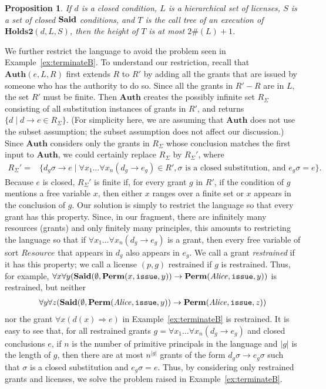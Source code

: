 \documentclass{acmtrans2m}
\newtheorem{proposition}[theorem]{Proposition}
\newcommand{\pro}{\begin{proposition}}
\newcommand{\epro}{\end{proposition}}
\newcommand{\rimp}{\Rightarrow}
\newcommand{\<}{
}
\renewcommand{\>}{\rangle}
\newcommand{\card}[1]{\#({#1})}
\newcommand{\Said}{\mathit{\bf Said}}
\newcommand{\Permitted}{\mathit{\bf Perm}}
\newcommand{\cd}{d}
\newcommand{\cc}{e}
\newcommand{\issue}{\mathtt{issue}}
\newcommand{\imp}{\rightarrow}
\newcommand{\XA}{\textbf{Auth}}
\newcommand{\CMetTwo}{\textbf{Holds2}}
\newcommand{\Rsrc}{\mathit{Resource}}
\begin{document}
\pro\label{p:fixExB}
If $\cd$ is a closed condition, $L$ is a hierarchical set of licenses, $S$ is a set of closed
$\Said$ conditions, and $T$ is the call tree of an execution of $\CMetTwo(\cd, L, S)$, then the
height of $T$ is at most $2\card{L}+1$.
\epro

We further restrict the language to avoid the problem seen in Example~\ref{ex:terminateB}.
To understand our restriction, recall that $\XA(\cc,L,R)$ first extends $R$ to $R'$ by
adding all the grants that are issued by someone who has the authority to do so.  Since
all the grants in $R'-R$ are in $L$, the set $R'$ must be finite.  Then $\XA$ creates the
possibly infinite set $R_\Sigma$ consisting of all substitution instances of grants in
$R'$, and returns $\{\cd \mid \cd\imp \cc \in R_{\Sigma}\}$.  (For simplicity here, we
are assuming that $\XA$ does not use the subset assumption; the subset assumption does
not affect our discussion.)  Since $\XA$ considers only the grants in $R_{\Sigma}$ whose
conclusion matches the first input to $\XA$, we could certainly replace $R_{\Sigma}$ by
$R_{\Sigma}'$, where
$$
\begin{array}{ll}
R_\Sigma' = &\{\cd_g\sigma\imp\cc \mid \forall x_1 \ldots \forall x_n (\cd_g\imp\cc_g)
\in R', \sigma \mbox{ is a closed substitution, and }\cc_g\sigma = \cc\}.
\end{array}
$$
Because $\cc$ is closed, $R_\Sigma'$ is finite if, for every grant $g$ in $R'$, if the
condition of $g$ mentions a free variable $x$, then either $x$ ranges over a finite set
or $x$ appears in the conclusion of $g$.  Our solution is simply to restrict the language
so that every grant has this property.  Since, in our fragment, there are infinitely many
resources (grants) and only finitely many principles, this amounts to restricting the
language so that if $\forall x_1 \ldots \forall x_n (\cd_g\imp\cc_g)$ is a grant, then
every free variable of sort $\Rsrc$ that appears in $\cd_g$ also appears in $\cc_g$.
We call a grant \emph{restrained} if it has this property; we call a license $(p, g)$
restrained if $g$ is restrained.  Thus, for example,
$\forall x \forall y (\Said(\emptyset, \Permitted(x, \issue, y))\imp
\Permitted(\mathit{Alice}, \issue, y))$ is restrained, but neither
$$
\begin{array}{ll}
\forall y \forall z (\Said(\emptyset, \Permitted(\mathit{Alice}, \issue, y))\imp
\Permitted(\mathit{Alice}, \issue, z))
\end{array}
$$
nor the grant $\forall x (d(x) \rimp\cc)$ in Example~\ref{ex:terminateB} is restrained.
It is easy to see that, for all restrained grants
$g = \forall x_1 \ldots \forall x_n (\cd_g\imp\cc_g)$ and closed conclusions $\cc$, if $n$
is the number of primitive principals in the language and $|g|$ is the length of $g$, then
there are at most $n^{|g|}$ grants of the form $\cd_g\sigma\imp\cc_g\sigma$ such that
$\sigma$ is a closed substitution and $\cc_g\sigma = \cc$.  Thus, by considering only
restrained grants and licenses, we solve the problem raised in Example~\ref{ex:terminateB}.
\end{document}
